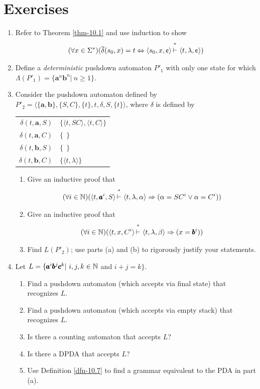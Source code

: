 \section*{Exercises}
\begin{enumerate}[{10.}1.]
\item Refer to Theorem \ref{thm-10.1} and use induction to show
\[ (\forall x\in\Sigma^*)(\DBAR(s_0,x) = t \Leftrightarrow \langle s_0,x,\cent
	\rangle\Dvdash\langle t,\lambda,\cent\rangle) \]

\item Define a \emph{deterministic} pushdown automaton $P'_1$ with only one
state for which $\Lambda(P'_1) = \{\pmb{a}^n\pmb{b}^n|\ n \geq 1\}$.

\item Consider the pushdown automaton defined by $P'_2 = \langle\{\pmb{a},
\pmb{b}\},\{S,C\},\{t\},t,\delta,S,\{t\}\rangle$, where $\delta$ is defined by
\begin{center}\begin{tabular}{r@{ = }l}
$\delta(t,\pmb{a},S)$ & $\{\langle t,SC\rangle,\langle t,C\rangle\}$ \\
$\delta(t,\pmb{a},C)$ & $\{\ \ \}$ \\
$\delta(t,\pmb{b},S)$ & $\{\ \ \}$ \\
$\delta(t,\pmb{b},C)$ & $\{\langle t,\lambda\rangle\}$
\end{tabular}\end{center}
\begin{enumerate}
\item Give an inductive proof that
\[ (\forall i\in\NN)(\langle t,\pmb{a}^i,S\rangle\Dvdash\langle t,\lambda,\alpha
	\rangle \Rightarrow (\alpha=SC^i\vee\alpha=C^i)) \]
\item Give an inductive proof that
\[ (\forall i\in\NN)(\langle t,x,C^i\rangle\Dvdash\langle t,\lambda,\beta\rangle
	\Rightarrow (x=\pmb{b}^i)) \]
\item Find $L(P'_2)$; use parts (a) and (b) to rigorously justify your
statements.
\end{enumerate}

\item Let $L=\{\pmb{a}^i\pmb{b}^j\pmb{c}^k|\ i,j,k\in\NN$ and $i+j=k\}$.
\begin{enumerate}
\item Find a pushdown automaton (which accepts via final state) that recognizes
$L$.
\item Find a pushdown automaton (which accepts via empty stack) that recognizes
$L$.
\item Is there a counting automaton that accepts $L$?
\item Is there a DPDA that accepts $L$?
\item Use Definition \ref{dfn-10.7} to find a grammar equivalent to the PDA in part (a).
\end{enumerate}


\end{enumerate}
